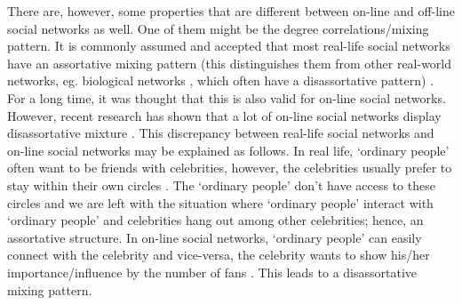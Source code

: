 \documentclass[11 pt , letterpaper , twoside , openright]{book}
\begin{document}
There are, however, some properties that are different between on-line and off-line social networks as well. One of them might be the degree correlations/mixing pattern. It is commonly assumed and accepted that most real-life social networks have an assortative mixing pattern (this distinguishes them from other real-world networks, eg. biological networks \cite{F.Costa2007}, which often have a disassortative pattern) \cite{Hu2009}\cite{Zhang2014}. For a long time, it was thought that this is also valid for on-line social networks. However, recent research has shown that a lot of on-line social networks display disassortative mixture \cite{Hu2009}\cite{Zhang2014}. This discrepancy between real-life social networks and on-line social networks may be explained as follows. In real life, `ordinary people' often want to be friends with celebrities, however, the celebrities usually prefer to stay within their own circles \cite{Hu2009}\cite{Zhang2014}. The `ordinary people' don't have access to these circles and we are left with the situation where `ordinary people' interact with `ordinary people' and celebrities hang out among other celebrities; hence, an assortative structure. In on-line social networks, `ordinary people' can easily connect with the celebrity and vice-versa, the celebrity wants to show his/her importance/influence by the number of fans \cite{Hu2009}\cite{Zhang2014}. This leads to a disassortative mixing pattern.
\end{document}
